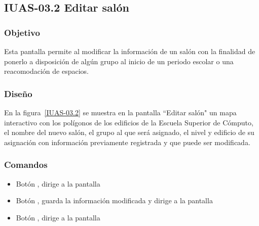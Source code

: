 \subsection{IUAS-03.2 Editar salón}

\subsubsection{Objetivo}

	
    Esta pantalla permite al  modificar la información de un salón con la finalidad de ponerlo a disposición de algún grupo al inicio de un periodo escolar o una reacomodación de espacios.
    
\subsubsection{Diseño}


    En la figura~\ref{IUAS-03.2} se muestra en la pantalla ``Editar salón" un mapa interactivo con los polígonos de los edificios de la Escuela Superior de Cómputo, el nombre del nuevo salón, el grupo al que será asignado, el nivel y edificio de su asignación con información previamente registrada y que puede ser modificada.


\subsubsection{Comandos}
    \begin{itemize}

	\item Botón , dirige a la pantalla 
	\item Botón , guarda la información modificada y dirige a la pantalla 
	\item Botón , dirige a la pantalla 
    \end{itemize}
